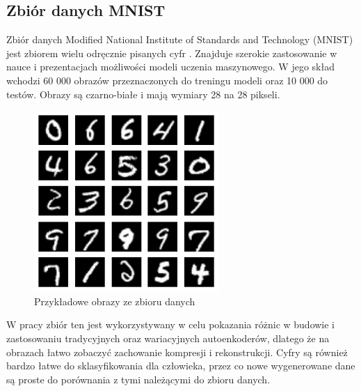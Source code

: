 \documentclass[a4paper,12pt,oneside]{book} %
\begin{document}
\subsection{Zbiór danych MNIST}
Zbiór danych Modified National Institute of Standards and Technology (MNIST) jest zbiorem wielu odręcznie pisanych cyfr \cite{mnist}. Znajduje szerokie zastosowanie w nauce i prezentacjach możliwości modeli uczenia maszynowego. W jego skład wchodzi 60 000 obrazów przeznaczonych do treningu modeli oraz 10 000 do testów. Obrazy są czarno-białe i mają wymiary 28 na 28 pikseli.
\begin{figure}[h]
	\centering\includegraphics[width=7cm]{pictures/mnist.png}
	\caption{Przykładowe obrazy ze zbioru danych}
\end{figure}

W pracy zbiór ten jest wykorzystywany w celu pokazania różnic w budowie i zastosowaniu tradycyjnych oraz wariacyjnych autoenkoderów, dlatego że na obrazach łatwo zobaczyć zachowanie kompresji i rekonstrukcji. Cyfry są również bardzo łatwe do sklasyfikowania dla człowieka, przez co nowe wygenerowane dane są proste do porównania z tymi należącymi do zbioru danych.
\newpage
\end{document}
